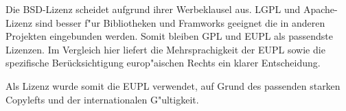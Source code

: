 Die \ac{BSD}-Lizenz scheidet aufgrund ihrer Werbeklausel aus. \ac{LGPL} und Apache-Lizenz sind besser f"ur Bibliotheken und Framworks geeignet die in anderen Projekten eingebunden werden. Somit bleiben \ac{GPL} und \ac{EUPL} als passendste Lizenzen. Im Vergleich hier liefert die Mehrsprachigkeit der \ac{EUPL} sowie die spezifische Berücksichtigung europ"aischen Rechts ein klarer Entscheidung.

Als Lizenz wurde somit die \ac{EUPL} verwendet, auf Grund des passenden starken Copylefts und der internationalen G"ultigkeit.